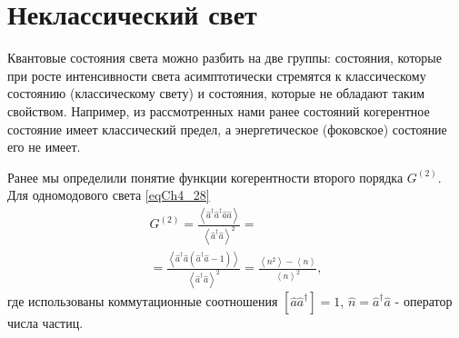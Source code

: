 \chapter{Неклассический свет}
\label{chNonClass}
Квантовые состояния света можно разбить на две группы: состояния,
которые при росте интенсивности света асимптотически стремятся к
классическому состоянию (классическому свету) и состояния, которые не
обладают таким свойством. Например, из рассмотренных нами ранее
состояний когерентное состояние имеет классический предел, а
энергетическое (фоковское) состояние его не имеет.

Ранее мы определили понятие функции когерентности второго порядка 
$G^{(2)}$. Для одномодового света \eqref{eqCh4_28}
\begin{eqnarray}
G^{(2)} = \frac{\left<\hat{a}^{\dag}\hat{a}^{\dag}\hat{a}\hat{a}\right>}
{\left<\hat{a}^{\dag}\hat{a}\right>^2} = 
\nonumber \\
= 
\frac{\left<\hat{a}^{\dag}\hat{a}\left(\hat{a}^{\dag}\hat{a} - 1\right)\right>}
{\left<\hat{a}^{\dag}\hat{a}\right>^2} = 
\frac{\left<n^2\right> - \left<n\right>}{\left<n\right>^2},
\label{eqPart3_Nonclass_Nonclass1}
\end{eqnarray}
где использованы коммутационные соотношения
$\left[\hat{a}\hat{a}^{\dag}\right] = 1$, 
$\hat{n} = \hat{a}^{\dag}\hat{a}$ - оператор числа частиц.

